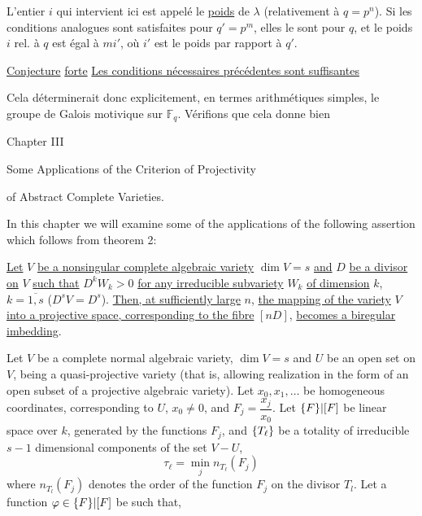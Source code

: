 L'entier $i$ qui intervient ici est appelé le \uline{poids} de $\lambda$ (relativement à $q=p^n$).  Si les conditions  analogues sont satisfaites pour $q'=p^m$, elles le sont pour $q$, et le poids $i$ rel. à $q$ est égal à $mi'$, où $i'$ est le poids par rapport à $q'$.


\uline{Conjecture}  \uline{forte} \uline{Les conditions nécessaires précédentes sont suffisantes}

Cela déterminerait donc explicitement, en termes arithmétiques simples, le groupe de Galois motivique  sur $\mathbb F_q$. Vérifions que cela donne bien



\begin{center}
Chapter III

Some Applications of the Criterion of Projectivity

of Abstract Complete Varieties.
\end{center}

In this chapter we will examine some of the applications of the following assertion which follows from theorem 2:

\uline{Let} $V$ \uline{be a nonsingular complete algebraic variety} $\dim V=s$ \uline{and} $D$ \uline{be a divisor on} $V$ \uline{such that} $D^kW_k>0$ \uline{for any irreducible subvariety} $W_k$ \uline{of dimension} $k$, $k=\overline{1,s}$ ($D^sV=D^s$). \uline{Then, at sufficiently large} $n$, \uline{the mapping of the variety} $V$ \uline{into a projective space, corresponding to the fibre} $[nD]$, \uline{becomes a biregular imbedding}.

Let $V$ be a complete normal algebraic variety, $\dim V=s$ and $U$ be an open set on $V$, being a quasi-projective variety (that is, allowing realization in the form of an open subset of a projective algebraic variety).
Let $x_0,x_1,\ldots$ be homogeneous coordinates, corresponding to $U$, $x_0\ne0$, and $F_j=\dfrac{x_j}{x_0}$. Let ${\{F\}|[F]}$ be  linear space over $k$, generated by the functions $F_j$, and $\{T_{{\ell}}\}$ be a totality of irreducible $s-1$ dimensional components of the set $V-U$,
\margin{$\ell$}
\[
\tau_\ell=\min_j n_{T_\ell}(F_j)
\]
where $n_{T_l}(F_j)$ denotes the order of the function $F_j$ on the divisor $T_l$. Let a function $\varphi\in{\{F\}|[F]}$ be such that,

